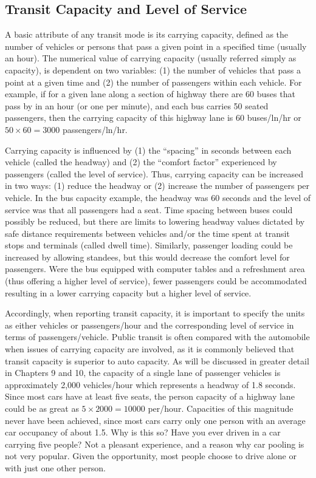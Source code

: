 \subsection{Transit Capacity and Level of Service}
A basic attribute of any transit mode is its carrying capacity, defined as the number of vehicles or persons that pass a given point in a specified time (usually an hour). The numerical value of carrying capacity (usually referred simply as capacity), is dependent on two variables: (1) the number of vehicles that pass a point at a given time and (2) the number of passengers within each vehicle. For example, if for a given lane along a section of highway there are 60 buses that pass by in an hour (or one per minute), and each bus carries 50 seated passengers, then the carrying capacity of this highway lane is 60 buses/ln/hr or $50 \times 60 = 3000$ passengers/ln/hr.\\
\par
Carrying capacity is influenced by (1) the “spacing” in seconds between each
vehicle (called the headway) and (2) the “comfort factor” experienced by passengers (called the level of service). Thus, carrying capacity can be increased in two ways: (1) reduce the headway or (2) increase the number of passengers per vehicle. In the bus capacity example, the headway was 60 seconds and the level of service was that all passengers had a seat. Time spacing between buses could possibly be reduced, but there are limits to lowering headway values dictated by safe distance requirements between vehicles and/or the time spent at transit stops and terminals (called dwell time). Similarly, passenger loading could be increased by allowing standees, but this would decrease the comfort level for passengers. Were the bus equipped with computer tables and a refreshment area (thus offering a higher level of service), fewer passengers could be accommodated resulting in a lower carrying capacity but a higher level of service.\\
\par
Accordingly, when reporting transit capacity, it is important to specify the units
as either vehicles or passengers/hour and the corresponding level of service in terms of passengers/vehicle. Public transit is often compared with the automobile when issues of carrying capacity are involved, as it is commonly believed that transit capacity is superior to auto capacity. As will be discussed in greater detail in Chapters 9 and 10, the capacity of a single lane of passenger vehicles is approximately 2,000 vehicles/hour which represents a headway of 1.8 seconds. Since most cars have at least five seats, the person capacity of a highway lane could be as great as $ 5 \times 2000 = 10000 $ per/hour. Capacities of this magnitude never have been achieved, since most cars carry only one person with an average car occupancy of about 1.5. Why is this so? Have you ever driven in a car carrying five people? Not a pleasant experience, and a reason why car pooling is not very popular. Given the opportunity, most people choose to drive alone or with just one other person.\\
